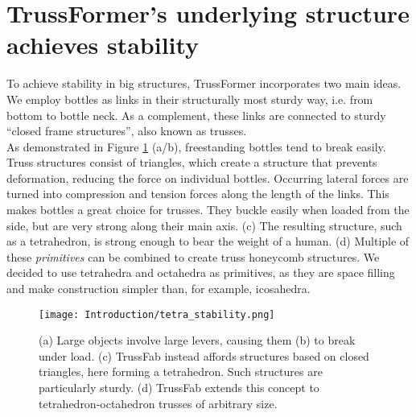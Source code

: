 \section{TrussFormer’s underlying structure achieves stability}
To achieve stability in big structures, TrussFormer incorporates two main ideas. We employ bottles as links in their structurally most sturdy way, i.e. from bottom to bottle neck. As a complement, these links are connected to sturdy ``closed frame structures'', also known as trusses.\\
As demonstrated in Figure \ref{fig:tetra_stability} (a/b), freestanding bottles tend to break easily. Truss structures consist of triangles, which create a structure that prevents deformation, reducing the force on individual bottles. Occurring lateral forces are turned into compression and tension forces along the length of the links. This makes bottles a great choice for trusses. They buckle easily when loaded from the side, but are very strong along their main axis. (c) The resulting structure, such as a tetrahedron, is strong enough to bear the weight of a human. (d) Multiple of these \textit{primitives} can be combined to create truss honeycomb structures. We decided to use tetrahedra and octahedra as primitives, as they are space filling and make construction simpler than, for example, icosahedra.
\begin{figure}[h!]
    \texttt{[image: Introduction/tetra\_stability.png]}
    \centering
    \caption{(a) Large objects involve large levers, causing them (b) to break under load. (c) TrussFab instead affords structures based on closed triangles, here forming a tetrahedron. Such structures are particularly sturdy. (d) TrussFab extends this concept to tetrahedron-octahedron trusses of arbitrary size.}
    \label{fig:tetra_stability}
\end{figure}


